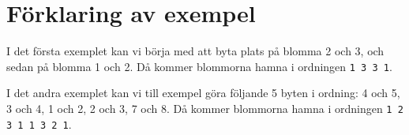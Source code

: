 \section*{Förklaring av exempel}
I det första exemplet kan vi börja med att byta plats på blomma 2 och 3, och sedan på blomma 1 och 2.
Då kommer blommorna hamna i ordningen \texttt{1 3 3 1}.

I det andra exemplet kan vi till exempel göra följande 5 byten i ordning:
4 och 5, 3 och 4, 1 och 2, 2 och 3, 7 och 8.
Då kommer blommorna hamna i ordningen \texttt{1 2 3 1 1 3 2 1}.

